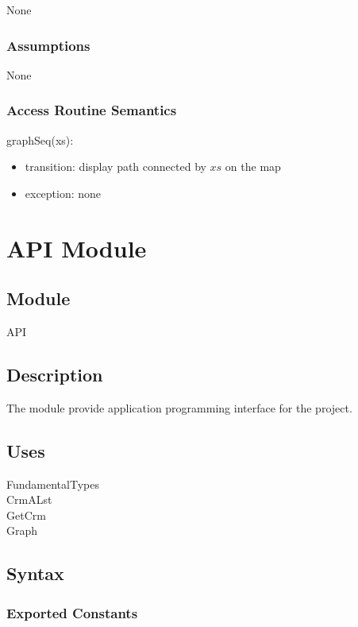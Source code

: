 \documentclass[12pt]{article}
\begin{document}
None

\subsubsection* {Assumptions}

None

\subsubsection* {Access Routine Semantics}

\noindent graphSeq(xs):
\begin{itemize}
\item transition: display path connected by $xs$ on the map
\item exception: none
\end{itemize}

\newpage
\section* {API Module}

\subsection*{Module}

API

\subsection*{Description}
The module provide application programming interface for the project.

\subsection* {Uses}

 FundamentalTypes\\
 CrmALst\\
 GetCrm\\
 Graph

\subsection* {Syntax}

\subsubsection* {Exported Constants}
\end{document}
